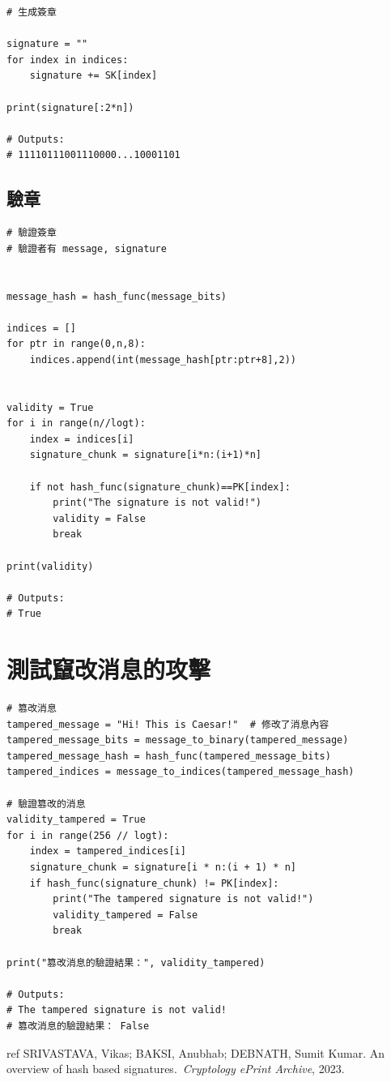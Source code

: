 \documentclass[
]{article}
\begin{document}
\begin{verbatim}
# 生成簽章

signature = ""
for index in indices:
    signature += SK[index]

print(signature[:2*n])

# Outputs:
# 11110111001110000...10001101
\end{verbatim}

\hypertarget{ux9a57ux7ae0}{%
\subsection{驗章}\label{ux9a57ux7ae0}}

\begin{verbatim}
# 驗證簽章
# 驗證者有 message, signature


message_hash = hash_func(message_bits)

indices = []
for ptr in range(0,n,8):
    indices.append(int(message_hash[ptr:ptr+8],2))


validity = True
for i in range(n//logt):
    index = indices[i]
    signature_chunk = signature[i*n:(i+1)*n]

    if not hash_func(signature_chunk)==PK[index]:
        print("The signature is not valid!")
        validity = False
        break

print(validity)

# Outputs:
# True
\end{verbatim}

\hypertarget{ux6e2cux8a66ux7ac4ux6539ux6d88ux606fux7684ux653bux64ca}{%
\section{測試竄改消息的攻擊}\label{ux6e2cux8a66ux7ac4ux6539ux6d88ux606fux7684ux653bux64ca}}

\begin{verbatim}
# 篡改消息
tampered_message = "Hi! This is Caesar!"  # 修改了消息內容
tampered_message_bits = message_to_binary(tampered_message)
tampered_message_hash = hash_func(tampered_message_bits)
tampered_indices = message_to_indices(tampered_message_hash)

# 驗證篡改的消息
validity_tampered = True
for i in range(256 // logt):
    index = tampered_indices[i]
    signature_chunk = signature[i * n:(i + 1) * n]
    if hash_func(signature_chunk) != PK[index]:
        print("The tampered signature is not valid!")
        validity_tampered = False
        break

print("篡改消息的驗證結果：", validity_tampered)

# Outputs:
# The tampered signature is not valid!
# 篡改消息的驗證結果： False
\end{verbatim}

ref SRIVASTAVA, Vikas; BAKSI, Anubhab; DEBNATH, Sumit Kumar. An overview
of hash based signatures.~\emph{Cryptology ePrint Archive}, 2023.
\end{document}

